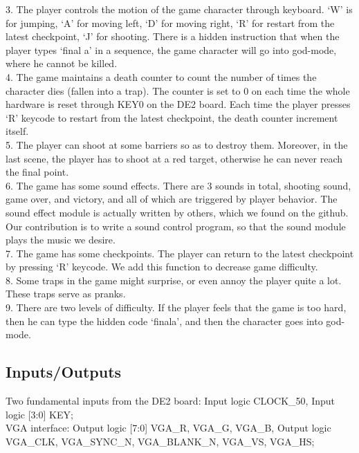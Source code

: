\documentclass[12pt]{article}
\begin{document}
3.	The player controls the motion of the game character through keyboard. ‘W’ is for jumping, ‘A’ for moving left, ‘D’ for moving right, ‘R’ for restart from the latest checkpoint, ‘J’ for shooting. There is a hidden instruction that when the player types ‘final a’ in a sequence, the game character will go into god-mode, where he cannot be killed. \\

4.	The game maintains a death counter to count the number of times the character dies (fallen into a trap). The counter is set to 0 on each time the whole hardware is reset through KEY0 on the DE2 board. Each time the player presses ‘R’ keycode to restart from the latest checkpoint, the death counter increment itself. \\

5.	The player can shoot at some barriers so as to destroy them. Moreover, in the last scene, the player has to shoot at a red target, otherwise he can never reach the final point. \\

6.	The game has some sound effects. There are 3 sounds in total, shooting sound, game over, and victory, and all of which are triggered by player behavior. The sound effect module is actually written by others, which we found on the github. Our contribution is to write a sound control program, so that the sound module plays the music we desire. \\

7.	The game has some checkpoints. The player can return to the latest checkpoint by pressing ‘R’ keycode. We add this function to decrease game difficulty. \\

8.	Some traps in the game might surprise, or even annoy the player quite a lot. These traps serve as pranks. \\

9.	There are two levels of difficulty. If the player feels that the game is too hard, then he can type the hidden code ‘finala’, and then the character goes into god-mode. \\


\subsection{Inputs/Outputs}
Two fundamental inputs from the DE2 board:
Input logic CLOCK\_50,
Input logic [3:0] KEY; \\

VGA interface:
Output logic [7:0] VGA\_R, VGA\_G, VGA\_B, 
Output logic VGA\_CLK, VGA\_SYNC\_N, VGA\_BLANK\_N, VGA\_VS, VGA\_HS; \\
\end{document}
